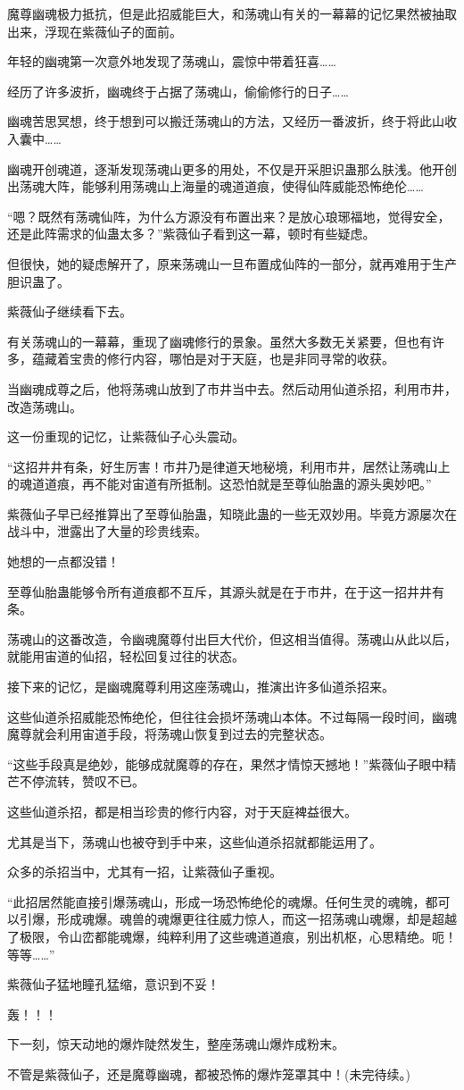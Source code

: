 \begin{this_body}
魔尊幽魂极力抵抗，但是此招威能巨大，和荡魂山有关的一幕幕的记忆果然被抽取出来，浮现在紫薇仙子的面前。

年轻的幽魂第一次意外地发现了荡魂山，震惊中带着狂喜……

经历了许多波折，幽魂终于占据了荡魂山，偷偷修行的日子……

幽魂苦思冥想，终于想到可以搬迁荡魂山的方法，又经历一番波折，终于将此山收入囊中……

幽魂开创魂道，逐渐发现荡魂山更多的用处，不仅是开采胆识蛊那么肤浅。他开创出荡魂大阵，能够利用荡魂山上海量的魂道道痕，使得仙阵威能恐怖绝伦……

“嗯？既然有荡魂仙阵，为什么方源没有布置出来？是放心琅琊福地，觉得安全，还是此阵需求的仙蛊太多？”紫薇仙子看到这一幕，顿时有些疑虑。

但很快，她的疑虑解开了，原来荡魂山一旦布置成仙阵的一部分，就再难用于生产胆识蛊了。

紫薇仙子继续看下去。

有关荡魂山的一幕幕，重现了幽魂修行的景象。虽然大多数无关紧要，但也有许多，蕴藏着宝贵的修行内容，哪怕是对于天庭，也是非同寻常的收获。

当幽魂成尊之后，他将荡魂山放到了市井当中去。然后动用仙道杀招，利用市井，改造荡魂山。

这一份重现的记忆，让紫薇仙子心头震动。

“这招井井有条，好生厉害！市井乃是律道天地秘境，利用市井，居然让荡魂山上的魂道道痕，再不能对宙道有所抵制。这恐怕就是至尊仙胎蛊的源头奥妙吧。”

紫薇仙子早已经推算出了至尊仙胎蛊，知晓此蛊的一些无双妙用。毕竟方源屡次在战斗中，泄露出了大量的珍贵线索。

她想的一点都没错！

至尊仙胎蛊能够令所有道痕都不互斥，其源头就是在于市井，在于这一招井井有条。

荡魂山的这番改造，令幽魂魔尊付出巨大代价，但这相当值得。荡魂山从此以后，就能用宙道的仙招，轻松回复过往的状态。

接下来的记忆，是幽魂魔尊利用这座荡魂山，推演出许多仙道杀招来。

这些仙道杀招威能恐怖绝伦，但往往会损坏荡魂山本体。不过每隔一段时间，幽魂魔尊就会利用宙道手段，将荡魂山恢复到过去的完整状态。

“这些手段真是绝妙，能够成就魔尊的存在，果然才情惊天撼地！”紫薇仙子眼中精芒不停流转，赞叹不已。

这些仙道杀招，都是相当珍贵的修行内容，对于天庭裨益很大。

尤其是当下，荡魂山也被夺到手中来，这些仙道杀招就都能运用了。

众多的杀招当中，尤其有一招，让紫薇仙子重视。

“此招居然能直接引爆荡魂山，形成一场恐怖绝伦的魂爆。任何生灵的魂魄，都可以引爆，形成魂爆。魂兽的魂爆更往往威力惊人，而这一招荡魂山魂爆，却是超越了极限，令山峦都能魂爆，纯粹利用了这些魂道道痕，别出机枢，心思精绝。呃！等等……”

紫薇仙子猛地瞳孔猛缩，意识到不妥！

轰！！！

下一刻，惊天动地的爆炸陡然发生，整座荡魂山爆炸成粉末。

不管是紫薇仙子，还是魔尊幽魂，都被恐怖的爆炸笼罩其中！(未完待续。)

\end{this_body}

